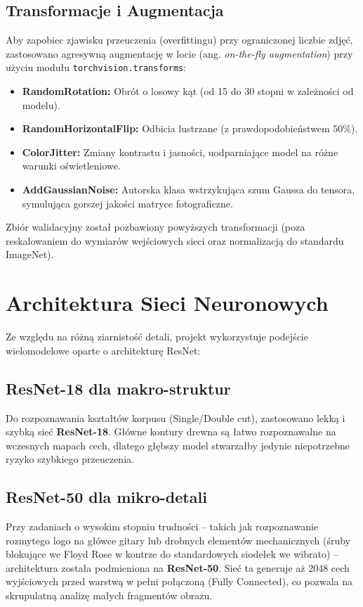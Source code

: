 \documentclass[12pt,a4paper]{article}
\begin{document}
\subsection{Transformacje i Augmentacja}
Aby zapobiec zjawisku przeuczenia (overfittingu) przy ograniczonej liczbie zdjęć, zastosowano agresywną augmentację w locie (ang. \textit{on-the-fly augmentation}) przy użyciu modułu \texttt{torchvision.transforms}:
\begin{itemize}
    \item \textbf{RandomRotation:} Obrót o losowy kąt (od 15 do 30 stopni w zależności od modelu).
    \item \textbf{RandomHorizontalFlip:} Odbicia lustrzane (z prawdopodobieństwem 50\%).
    \item \textbf{ColorJitter:} Zmiany kontrastu i jasności, uodparniające model na różne warunki oświetleniowe.
    \item \textbf{AddGaussianNoise:} Autorska klasa wstrzykująca szum Gaussa do tensora, symulująca gorszej jakości matryce fotograficzne.
\end{itemize}
Zbiór walidacyjny został pozbawiony powyższych transformacji (poza reskalowaniem do wymiarów wejściowych sieci oraz normalizacją do standardu ImageNet).

\section{Architektura Sieci Neuronowych}

Ze względu na różną ziarnistość detali, projekt wykorzystuje podejście wielomodelowe oparte o architekturę ResNet:

\subsection{ResNet-18 dla makro-struktur}
Do rozpoznawania kształtów korpusu (Single/Double cut), zastosowano lekką i szybką sieć \textbf{ResNet-18}. Główne kontury drewna są łatwo rozpoznawalne na wczesnych mapach cech, dlatego głębszy model stwarzałby jedynie niepotrzebne ryzyko szybkiego przeuczenia.

\subsection{ResNet-50 dla mikro-detali}
Przy zadaniach o wysokim stopniu trudności – takich jak rozpoznawanie rozmytego logo na główce gitary lub drobnych elementów mechanicznych (śruby blokujące we Floyd Rose w kontrze do standardowych siodełek we wibrato) – architektura została podmieniona na \textbf{ResNet-50}. 
Sieć ta generuje aż 2048 cech wyjściowych przed warstwą w pełni połączoną (Fully Connected), co pozwala na skrupulatną analizę małych fragmentów obrazu.
\end{document}

